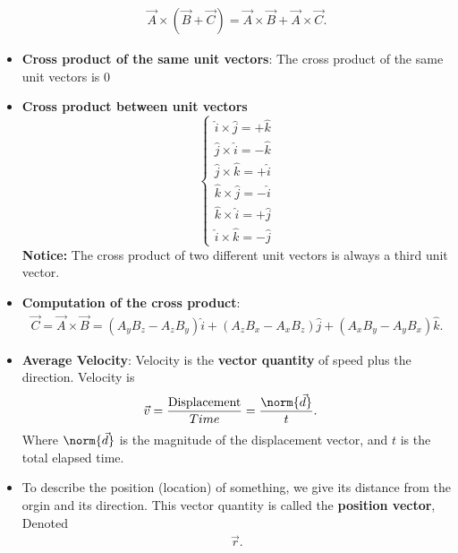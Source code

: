 \documentclass{report}
\begin{document}
\begin{itemize}
\begin{align*}
            \vec{A} \times (\vec{B} + \vec{C}) = \vec{A} \times \vec{B} + \vec{A} \times \vec{C}
        .\end{align*}
    \item \textbf{Cross product of the same unit vectors}: The cross product of the same unit vectors is 0
    \item \textbf{Cross product between unit vectors}
        \begin{equation}
            \begin{cases}
                \hat{i} \times \hat{j} = +\hat{k} \\
                \hat{j} \times \hat{i} = -\hat{k} \\
                \hat{j} \times \hat{k} = +\hat{i} \\
                \hat{k} \times \hat{j} = -\hat{i} \\
                \hat{k} \times \hat{i} = +\hat{j} \\
                \hat{i} \times \hat{k} = -\hat{j}
            \end{cases}
        \end{equation}
        \bigbreak \noindent 
        \textbf{Notice:} The cross product of two different unit vectors is always a third unit vector.
    \item \textbf{Computation of the cross product}:
        \begin{align*}
            \vec{C} = \vec{A} \times \vec{B} = (A_yB_z - A_zB_y)\hat{i} + (A_zB_x - A_xB_z)\hat{j} + (A_xB_y - A_yB_x)\hat{k}
        .\end{align*}
        \pagebreak 
    \item \textbf{Average Velocity}: Velocity is the \textbf{vector quantity} of speed plus the direction. Velocity is 
        \begin{align*}
            \vec{v} &=\frac{\text{Displacement}}{Time} = \frac{\norm{\vec{d}}}{t}
        .\end{align*}
        Where $\norm{\vec{d}}$ is the magnitude of the displacement vector, and $t$ is the total elapsed time.
    \item To describe the position (location) of something, we give its distance from the orgin and its direction. This vector quantity is called the \textbf{position vector}, Denoted
        \begin{align*}
            \vec{r}
        .\end{align*}
        \bigbreak \noindent 
    \begin{figure}[ht]

\end{figure}
\end{itemize}
\end{document}
